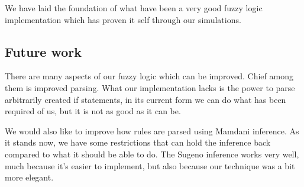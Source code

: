We have laid the foundation of what have been a very good fuzzy logic
implementation which has proven it self through our simulations.

\subsection{Future work}\label{future work}
There are many aspects of our fuzzy logic which can be improved. Chief among
them is improved parsing. What our implementation lacks is the power to
parse arbitrarily created if statements, in its current form we can do what
has been required of us, but it is not as good as it can be.

We would also like to improve how rules are parsed using Mamdani inference. As
it stands now, we have some restrictions that can hold the inference back compared
to what it should be able to do. The Sugeno inference works very well, much because
it's easier to implement, but also because our technique was a bit more elegant.
